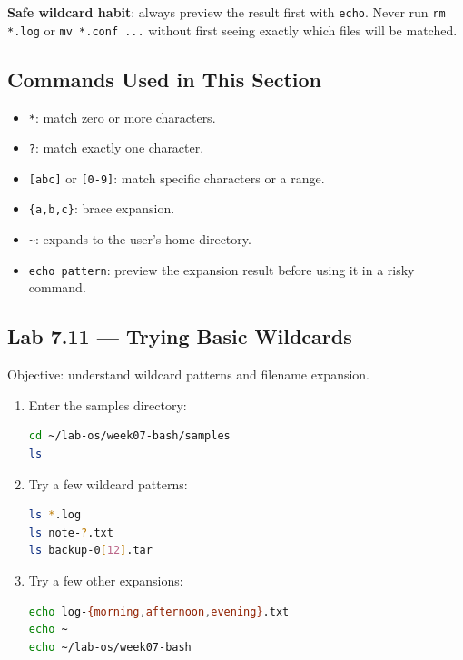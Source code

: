 \begin{tipbox}
\textbf{Safe wildcard habit}: always preview the result first with
\texttt{echo}. Never run \texttt{rm *.log} or \texttt{mv *.conf ...} without
first seeing exactly which files will be matched.
\end{tipbox}

\subsection*{Commands Used in This Section}

\begin{itemize}
  \item \texttt{*}: match zero or more characters.
  \item \texttt{?}: match exactly one character.
  \item \texttt{[abc]} or \texttt{[0-9]}: match specific characters or a range.
  \item \texttt{\{a,b,c\}}: brace expansion.
  \item \texttt{\textasciitilde}: expands to the user's home directory.
  \item \texttt{echo pattern}: preview the expansion result before using it
    in a risky command.
\end{itemize}

\subsection*{Lab 7.11 --- Trying Basic Wildcards}

Objective: understand wildcard patterns and filename expansion.

\begin{enumerate}
  \item Enter the samples directory:
\begin{lstlisting}[language=bash, caption={Entering the samples directory}]
cd ~/lab-os/week07-bash/samples
ls
\end{lstlisting}

  \item Try a few wildcard patterns:
\begin{lstlisting}[language=bash, caption={Trying basic wildcards}]
ls *.log
ls note-?.txt
ls backup-0[12].tar
\end{lstlisting}

  \item Try a few other expansions:
\begin{lstlisting}[language=bash, caption={Trying brace and tilde expansion}]
echo log-{morning,afternoon,evening}.txt
echo ~
echo ~/lab-os/week07-bash
\end{lstlisting}
\end{enumerate}

